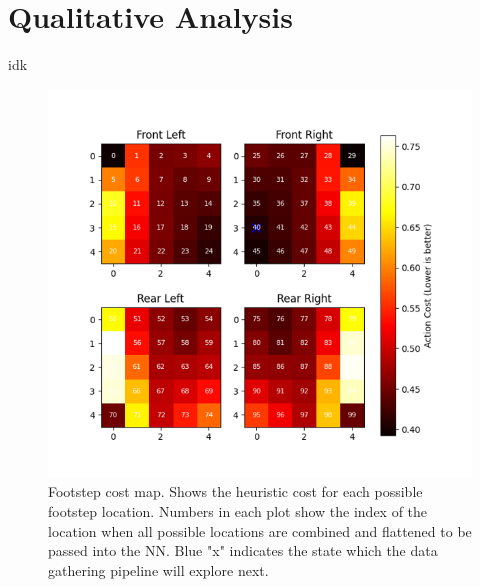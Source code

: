 \section{Qualitative Analysis}

\begin{outline}
  idk
\end{outline}

\begin{figure}
  \centering
  \includegraphics[width=0.75\linewidth]{images/data/footstep-cost-map.png}
  \caption{Footstep cost map. Shows the heuristic cost for each possible footstep location. Numbers in each plot show the index of the location when all possible locations are combined and flattened to be passed into the NN. Blue "x" indicates the state which the data gathering pipeline will explore next.}
  \label{fig:data-footstep-cost-map}
\end{figure}
